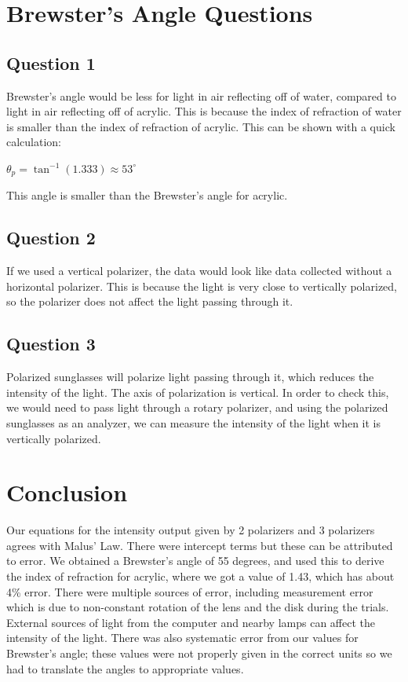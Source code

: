 \documentclass[a4paper, 11pt]{article}
\begin{document}
\section*{Brewster's Angle Questions}

\subsection*{Question 1}
Brewster's angle would be less for light in air reflecting off of water, compared to light in air reflecting off of acrylic. This is because the index of refraction of water is smaller than the index of refraction of acrylic. This can be shown with a quick calculation:
\begin{center}
$\theta_p = \tan^{-1}(1.333) \approx 53^{\circ}$
\end{center}
This angle is smaller than the Brewster's angle for acrylic.

\subsection*{Question 2}
If we used a vertical polarizer, the data would look like data collected without a horizontal polarizer. This is because the light is very close to vertically polarized, so the polarizer does not affect the light passing through it.

\subsection*{Question 3}
Polarized sunglasses will polarize light passing through it, which reduces the intensity of the light. The axis of polarization is vertical. In order to check this, we would need to pass light through a rotary polarizer, and using the polarized sunglasses as an analyzer, we can measure the intensity of the light when it is vertically polarized.

\section*{Conclusion}
Our equations for the intensity output given by 2 polarizers and 3 polarizers agrees with Malus' Law. There were intercept terms but these can be attributed to error. We obtained a Brewster's angle of 55 degrees, and used this to derive the index of refraction for acrylic, where we got a value of 1.43, which has about 4\% error. There were multiple sources of error, including measurement error which is due to non-constant rotation of the lens and the disk during the trials. External sources of light from the computer and nearby lamps can affect the intensity of the light. There was also systematic error from our values for Brewster's angle; these values were not properly given in the correct units so we had to translate the angles to appropriate values.
\end{document}
